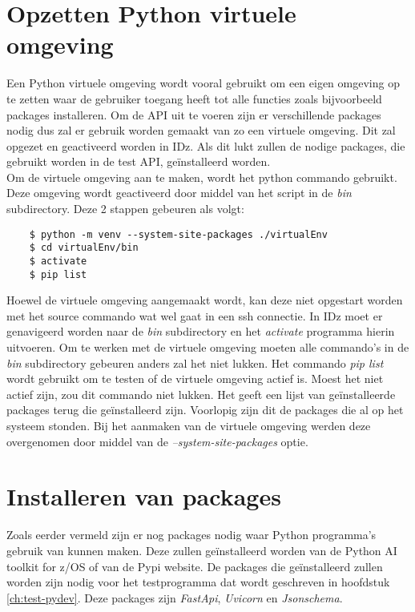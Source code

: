 \section{Opzetten Python virtuele omgeving}
Een Python virtuele omgeving wordt vooral gebruikt om een eigen omgeving op te zetten waar de gebruiker toegang heeft tot alle functies zoals bijvoorbeeld packages installeren. Om de API uit te voeren zijn er verschillende packages nodig dus zal er gebruik worden gemaakt van zo een virtuele omgeving. Dit zal opgezet en geactiveerd worden in IDz. Als dit lukt zullen de nodige packages, die gebruikt worden in de test API, geïnstalleerd worden. \\

Om de virtuele omgeving aan te maken, wordt het python  commando gebruikt. Deze omgeving wordt geactiveerd door middel van het  script in de \textit{bin} subdirectory. Deze 2 stappen gebeuren als volgt:

\begin{lstlisting}
    $ python -m venv --system-site-packages ./virtualEnv
    $ cd virtualEnv/bin
    $ activate
    $ pip list
\end{lstlisting}

Hoewel de virtuele omgeving aangemaakt wordt, kan deze niet opgestart worden met het source commando wat wel gaat in een ssh connectie. In IDz moet er genavigeerd worden naar de \textit{bin} subdirectory en het \textit{activate} programma hierin uitvoeren. Om te werken met de virtuele omgeving moeten alle commando's in de \textit{bin} subdirectory gebeuren anders zal het niet lukken.
Het commando \textit{pip list} wordt gebruikt om te testen of de virtuele omgeving actief is. Moest het niet actief zijn, zou dit commando niet lukken. Het geeft een lijst van geïnstalleerde packages terug die geïnstalleerd zijn. Voorlopig zijn dit de packages die al op het systeem stonden. Bij het aanmaken van de virtuele omgeving werden deze overgenomen door middel van de \textit{--system-site-packages} optie.

\section{Installeren van packages}
Zoals eerder vermeld zijn er nog packages nodig waar Python programma's gebruik van kunnen maken. Deze zullen geïnstalleerd worden van de Python AI toolkit for z/OS of van de Pypi website. De packages die geïnstalleerd zullen worden zijn nodig voor het testprogramma dat wordt geschreven in hoofdstuk \ref{ch:test-pydev}. Deze packages zijn \textit{FastApi}, \textit{Uvicorn} en \textit{Jsonschema}. \\

